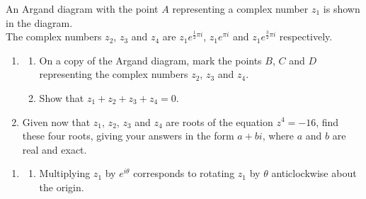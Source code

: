 \documentclass[leqno]{article}
\begin{document}
\djsFrontMatter
\begin{enumerate}[
  label=\textbf{\arabic*.},
  leftmargin=*,
  topsep=0pt,
  partopsep=0pt,
  parsep=0pt
]

\questionitem

\begin{figure}[H]
    \centering
{}
\end{figure}


An Argand diagram with the point $A$ representing a complex number $z_1$ is shown in the diagram. \\
The complex numbers $z_2$, $z_3$ and $z_4$ are $z_1e^{\frac{1}{2}\pi i}$, $z_1e^{\pi i}$ and $z_1e^{\frac{3}{2}\pi i}$ respectively. \\
\begin{enumerate}[label=\textbf{(\alph*)}]
  \item
  \begin{enumerate}[label=(\roman*)]
    \item On a copy of the Argand diagram, mark the points $B$, $C$ and $D$ representing the complex numbers $z_2$, $z_3$ and $z_4$. 
    \item Show that $z_1+z_2+z_3+z_4=0$.  \\
  \end{enumerate}
  \item Given now that $z_1$, $z_2$, $z_3$ and $z_4$ are roots of the equation $z^4=-16$, find these four roots, giving your answers in the form $a+bi$, where $a$ and $b$ are real and exact.  \\
\end{enumerate}

\vspace*{10pt}

\begin{djsSolution}
\begin{enumerate}[label=\textbf{(\alph*)}]
  \item
  \begin{enumerate}[label=(\roman*)]
    \item Multiplying $z_1$ by $e^{i\theta}$ corresponds to rotating $z_1$ by $\theta$ anticlockwise about the origin.


\end{enumerate}
\end{enumerate}
\end{djsSolution}
\end{enumerate}
\end{document}
